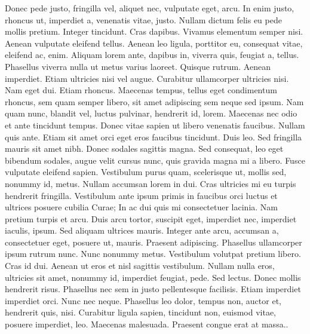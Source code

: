 \documentclass[a4paper,12pt]{article}
\begin{document}
Donec pede justo, fringilla vel, aliquet nec, vulputate eget, arcu. In enim justo, rhoncus ut, imperdiet a, venenatis vitae, justo. Nullam dictum felis eu pede mollis pretium. Integer tincidunt. Cras dapibus. Vivamus elementum semper nisi. Aenean vulputate eleifend tellus. Aenean leo ligula, porttitor eu, consequat vitae, eleifend ac, enim. Aliquam lorem ante, dapibus in, viverra quis, feugiat a, tellus. Phasellus viverra nulla ut metus varius laoreet. Quisque rutrum. Aenean imperdiet. Etiam ultricies nisi vel augue. Curabitur ullamcorper ultricies nisi. Nam eget dui. Etiam rhoncus. Maecenas tempus, tellus eget condimentum rhoncus, sem quam semper libero, sit amet adipiscing sem neque sed ipsum. Nam quam nunc, blandit vel, luctus pulvinar, hendrerit id, lorem. Maecenas nec odio et ante tincidunt tempus. Donec vitae sapien ut libero venenatis faucibus. Nullam quis ante. Etiam sit amet orci eget eros faucibus tincidunt. Duis leo. Sed fringilla mauris sit amet nibh. Donec sodales sagittis magna. Sed consequat, leo eget bibendum sodales, augue velit cursus nunc, quis gravida magna mi a libero. Fusce vulputate eleifend sapien. Vestibulum purus quam, scelerisque ut, mollis sed, nonummy id, metus. Nullam accumsan lorem in dui. Cras ultricies mi eu turpis hendrerit fringilla. Vestibulum ante ipsum primis in faucibus orci luctus et ultrices posuere cubilia Curae; In ac dui quis mi consectetuer lacinia. Nam pretium turpis et arcu. Duis arcu tortor, suscipit eget, imperdiet nec, imperdiet iaculis, ipsum. Sed aliquam ultrices mauris. Integer ante arcu, accumsan a, consectetuer eget, posuere ut, mauris. Praesent adipiscing. Phasellus ullamcorper ipsum rutrum nunc. Nunc nonummy metus. Vestibulum volutpat pretium libero. Cras id dui. Aenean ut eros et nisl sagittis vestibulum. Nullam nulla eros, ultricies sit amet, nonummy id, imperdiet feugiat, pede. Sed lectus. Donec mollis hendrerit risus. Phasellus nec sem in justo pellentesque facilisis. Etiam imperdiet imperdiet orci. Nunc nec neque. Phasellus leo dolor, tempus non, auctor et, hendrerit quis, nisi. Curabitur ligula sapien, tincidunt non, euismod vitae, posuere imperdiet, leo. Maecenas malesuada. Praesent congue erat at massa..
\end{document}
